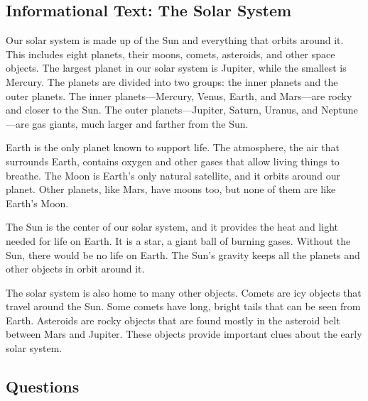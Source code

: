 \documentclass[12pt]{article}
\begin{document}
\onehalfspacing


\subsection*{Informational Text: The Solar System}

\begin{tcolorbox}[colframe=black!40, colback=gray!5]

\begin{spacing}{1.15}
    Our solar system is made up of the Sun and everything that orbits around it. This includes eight planets, their moons, comets, asteroids, and other space objects. The largest planet in our solar system is Jupiter, while the smallest is Mercury. The planets are divided into two groups: the inner planets and the outer planets. The inner planets—Mercury, Venus, Earth, and Mars—are rocky and closer to the Sun. The outer planets—Jupiter, Saturn, Uranus, and Neptune—are gas giants, much larger and farther from the Sun.

    Earth is the only planet known to support life. The atmosphere, the air that surrounds Earth, contains oxygen and other gases that allow living things to breathe. The Moon is Earth’s only natural satellite, and it orbits around our planet. Other planets, like Mars, have moons too, but none of them are like Earth’s Moon. 

    The Sun is the center of our solar system, and it provides the heat and light needed for life on Earth. It is a star, a giant ball of burning gases. Without the Sun, there would be no life on Earth. The Sun's gravity keeps all the planets and other objects in orbit around it.

    The solar system is also home to many other objects. Comets are icy objects that travel around the Sun. Some comets have long, bright tails that can be seen from Earth. Asteroids are rocky objects that are found mostly in the asteroid belt between Mars and Jupiter. These objects provide important clues about the early solar system.
\end{spacing}

\end{tcolorbox}

\vspace{0.5cm}


\subsection*{Questions}
\end{document}
